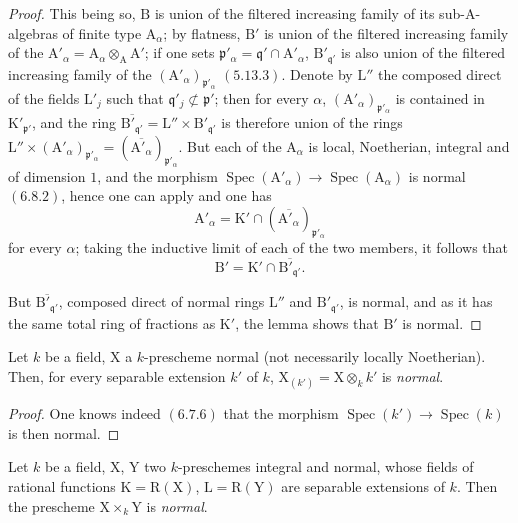 \begin{proof}
This being so, $\mathrm{B}$ is union of the filtered increasing family of its sub-$\mathrm{A}$-algebras of finite type
$\mathrm{A}_\alpha$; by flatness, $\mathrm{B}'$ is union of the filtered increasing family of the $\mathrm{A}'_\alpha=\mathrm{A}_\alpha\otimes_\mathrm{A}\mathrm{A}'$;
if one sets $\mathfrak{p}'_\alpha=\mathfrak{q}'\cap\mathrm{A}'_\alpha$, $\mathrm{B}'_{\mathfrak{q}'}$ is also union of the filtered increasing family of the $(\mathrm{A}'_\alpha)_{\mathfrak{p}'_\alpha}$
$(5.13.3)$. Denote by $\mathrm{L}''$ the composed direct of the fields $\mathrm{L}'_j$ such that $\mathfrak{q}'_j\not\subset\mathfrak{p}'$; then for
every $\alpha$, $(\mathrm{A}'_\alpha)_{\mathfrak{p}'_\alpha}$ is contained in $\mathrm{K}'_{\mathfrak{p}'}$, and the ring $\overline{\mathrm{B}'_{\mathfrak{q}'}}=\mathrm{L}''\times\mathrm{B}'_{\mathfrak{q}'}$ is therefore union of the
rings $\mathrm{L}''\times(\mathrm{A}'_\alpha)_{\mathfrak{p}'_\alpha}=(\overline{\mathrm{A}'_\alpha})_{\mathfrak{p}'_\alpha}$. But each of the $\mathrm{A}_\alpha$ is local, Noetherian, integral and of
dimension $1$, and the morphism $\operatorname{Spec}(\mathrm{A}'_\alpha)\to\operatorname{Spec}(\mathrm{A}_\alpha)$ is normal $(6.8.2)$, hence one can
apply  and one has
\[
  \mathrm{A}'_\alpha=\mathrm{K}'\cap(\overline{\mathrm{A}'_\alpha})_{\mathfrak{p}'_\alpha}
\]
for every $\alpha$; taking the inductive limit of each of the two members, it follows that
\[
  \mathrm{B}'=\mathrm{K}'\cap\overline{\mathrm{B}'_{\mathfrak{q}'}}.
\]

But $\overline{\mathrm{B}'_{\mathfrak{q}'}}$, composed direct of normal rings $\mathrm{L}''$ and $\mathrm{B}'_{\mathfrak{q}'}$, is normal, and as
it has the same total ring of fractions as $\mathrm{K}'$, the lemma  shows that $\mathrm{B}'$ is normal.
\end{proof}

\begin{corollary}[6.14.2]
\label{IV.6.14.2}
Let $k$ be a field, $\mathrm{X}$ a $k$-prescheme normal (not necessarily
locally Noetherian). Then, for every separable extension $k'$ of $k$, $\mathrm{X}_{(k')}=\mathrm{X}\otimes_k k'$ is
\emph{normal}.
\end{corollary}

\begin{proof}
One knows indeed $(6.7.6)$ that the morphism $\operatorname{Spec}(k')\to\operatorname{Spec}(k)$ is then normal.
\end{proof}

\begin{corollary}[6.14.3]
\label{IV.6.14.3}
Let $k$ be a field, $\mathrm{X}$, $\mathrm{Y}$ two $k$-preschemes integral and normal,
whose fields of rational functions $\mathrm{K}=\mathrm{R}(\mathrm{X})$, $\mathrm{L}=\mathrm{R}(\mathrm{Y})$ are separable extensions of $k$.
Then the prescheme $\mathrm{X}\times_k\mathrm{Y}$ is \emph{normal}.
\end{corollary}


